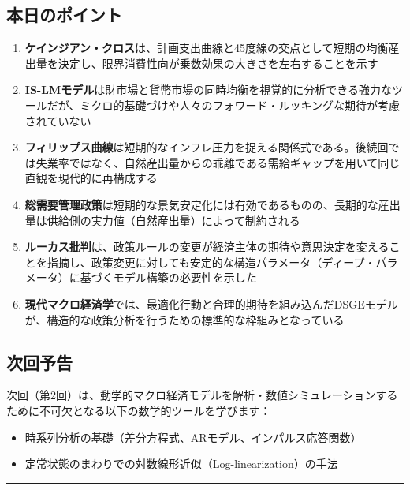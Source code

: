 \documentclass[
  japanese,
  lualatex,
  ja=standard,
  12pt,
  a4paper]{ltjsarticle}
\providecommand{\tightlist}{%
  \setlength{\itemsep}{0pt}\setlength{\parskip}{0pt}}
\begin{document}
\subsection{本日のポイント}\label{ux672cux65e5ux306eux30ddux30a4ux30f3ux30c8}

\begin{enumerate}
\def\labelenumi{\arabic{enumi}.}
\tightlist
\item
  \textbf{ケインジアン・クロス}は、計画支出曲線と45度線の交点として短期の均衡産出量を決定し、限界消費性向が乗数効果の大きさを左右することを示す
\item
  \textbf{IS-LMモデル}は財市場と貨幣市場の同時均衡を視覚的に分析できる強力なツールだが、ミクロ的基礎づけや人々のフォワード・ルッキングな期待が考慮されていない
\item
  \textbf{フィリップス曲線}は短期的なインフレ圧力を捉える関係式である。後続回では失業率ではなく、自然産出量からの乖離である需給ギャップを用いて同じ直観を現代的に再構成する
\item
  \textbf{総需要管理政策}は短期的な景気安定化には有効であるものの、長期的な産出量は供給側の実力値（自然産出量）によって制約される
\item
  \textbf{ルーカス批判}は、政策ルールの変更が経済主体の期待や意思決定を変えることを指摘し、政策変更に対しても安定的な構造パラメータ（ディープ・パラメータ）に基づくモデル構築の必要性を示した
\item
  \textbf{現代マクロ経済学}では、最適化行動と合理的期待を組み込んだDSGEモデルが、構造的な政策分析を行うための標準的な枠組みとなっている
\end{enumerate}

\subsection{次回予告}\label{ux6b21ux56deux4e88ux544a}

次回（第2回）は、動学的マクロ経済モデルを解析・数値シミュレーションするために不可欠となる以下の数学的ツールを学びます：

\begin{itemize}
\tightlist
\item
  時系列分析の基礎（差分方程式、ARモデル、インパルス応答関数）
\item
  定常状態のまわりでの対数線形近似（Log-linearization）の手法
\end{itemize}

\begin{center}\rule{0.5\linewidth}{0.5pt}\end{center}
\end{document}
